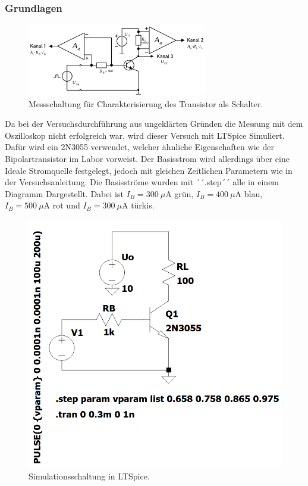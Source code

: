 \documentclass[
	a4paper, %
	12pt, %
]{CSUniSchoolLabReport}
\newcommand{\micro}{\ensuremath{\mu}}
\begin{document}
\subsubsection{Grundlagen}
\begin{figure}[H]
	\centering
	\includegraphics[width=0.7\textwidth]{Figures/MessschaltungSchaltanwendung.png}
	\caption{Messschaltung für Charakterisierung des Transistor als Schalter.}
	\label{fig:MessschaltungSchaltanwendung}
\end{figure}
Da bei der Versuchsdurchführung aus ungeklärten Gründen die Messung mit dem Oszilloskop nicht erfolgreich war, wird dieser Versuch mit LTSpice Simuliert. Dafür wird ein 2N3055 verwendet, welcher ähnliche Eigenschaften wie der Bipolartransistor im Labor vorweist.  
Der Basisstrom wird allerdings über eine Ideale Stromquelle festgelegt, jedoch mit gleichen Zeitlichen Parametern wie in der Versuchsanleitung.
Die Basisströme wurden mit ´´.step´´ alle in einem Diagramm Dargestellt. Dabei ist $I_B = \SI{300}{\micro\ampere}$ grün, $I_B = \SI{400}{\micro\ampere}$ blau, $I_B = \SI{500}{\micro\ampere}$ rot und $I_B = \SI{300}{\micro\ampere}$ türkis.
\begin{figure}[H]
	\centering
	\includegraphics[width=0.6 \textwidth]{Figures/LTSpiceSchaltung.png}
	\caption{Simulationsschaltung in LTSpice.}
	\label{fig:LTSpiceSchaltung}
\end{figure}
\end{document}
